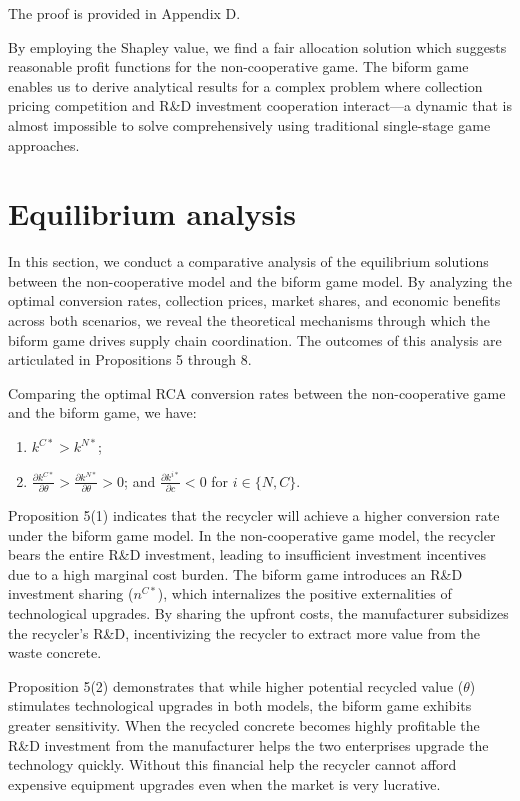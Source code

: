\documentclass[authoryear,preprint,review,times,10pt]{elsarticle}
\begin{document}
 The proof is provided in Appendix D.

By employing the Shapley value, we find a fair allocation solution which suggests reasonable profit functions for the non-cooperative game. The biform game enables us to derive analytical results for a complex problem where collection pricing competition and R\&D investment cooperation interact—a dynamic that is almost impossible to solve comprehensively using traditional single-stage game approaches.

\section{Equilibrium analysis}
\label{sec:equilibrium_analysis}
In this section, we conduct a comparative analysis of the equilibrium solutions between the non-cooperative model and the biform game model. By analyzing the optimal conversion rates, collection prices, market shares, and economic benefits across both scenarios, we reveal the theoretical mechanisms through which the biform game drives supply chain coordination. The outcomes of this analysis are articulated in Propositions 5 through 8.


\begin{prop}
\label{prop:technology_comparison}
Comparing the optimal RCA conversion rates between the non-cooperative game and the biform game, we have:
\begin{enumerate}[label={(\arabic*)}]
\item $k^{C*} > k^{N*}$;
\item $\frac{\partial k^{C*}}{\partial \theta} > \frac{\partial k^{N*}}{\partial \theta} > 0$; and $\frac{\partial k^{i*}}{\partial c} < 0$ for $i \in \{N, C\}$.
\end{enumerate}
\end{prop}

Proposition 5(1) indicates that the recycler will achieve a higher conversion rate under the biform game model. In the non-cooperative game model, the recycler bears the entire R\&D investment, leading to insufficient investment incentives due to a high marginal cost burden. The biform game introduces an R\&D investment sharing ($n^{C*}$), which internalizes the positive externalities of technological upgrades. By sharing the upfront costs, the manufacturer subsidizes the recycler's R\&D, incentivizing the recycler to extract more value from the waste concrete.

Proposition 5(2) demonstrates that while higher potential recycled value ($\theta$) stimulates technological upgrades in both models, the biform game exhibits greater sensitivity. When the recycled concrete becomes highly profitable the R\&D investment from the manufacturer helps the two enterprises upgrade the technology quickly. Without this financial help the recycler cannot afford expensive equipment upgrades even when the market is very lucrative.
\end{document}
